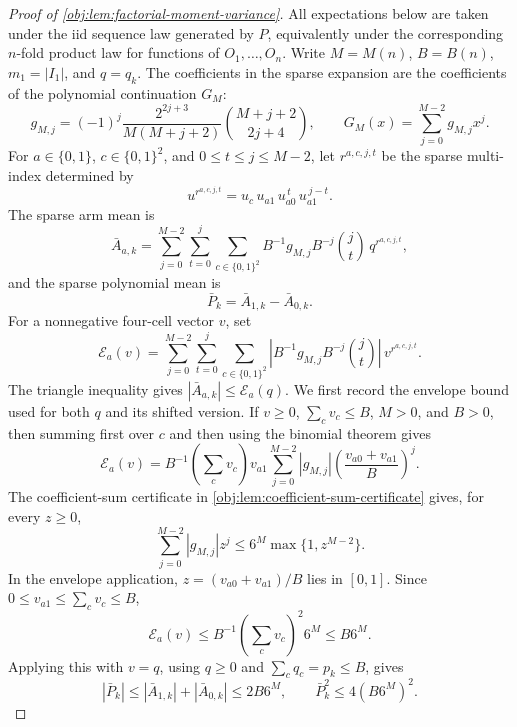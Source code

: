 \documentclass[11pt]{article}
\begin{document}
\begin{proof}[Proof of \cref{obj:lem:factorial-moment-variance}]
All expectations below are taken under the iid sequence law generated by \(P\), equivalently under the corresponding \(n\)-fold product law for functions of \(O_1,\ldots,O_n\). Write \(M=M(n)\), \(B=B(n)\), \(m_1=|I_1|\), and \(q=q_k\). The coefficients in the sparse expansion are the coefficients of the polynomial continuation \(G_M\):
\[
g_{M,j}=(-1)^j\frac{2^{2j+3}}{M(M+j+2)}\binom{M+j+2}{2j+4},
\qquad
G_M(x)=\sum_{j=0}^{M-2} g_{M,j}x^j .
\]
For \(a\in\{0,1\}\), \(c\in\{0,1\}^2\), and \(0\le t\le j\le M-2\), let \(r^{a,c,j,t}\) be the sparse multi-index determined by
\[
u^{r^{a,c,j,t}}=u_c\,u_{a1}\,u_{a0}^{\,t}\,u_{a1}^{\,j-t}.
\]
The sparse arm mean is
\[
\bar A_{a,k}
=
\sum_{j=0}^{M-2}\sum_{t=0}^{j}\sum_{c\in\{0,1\}^2}
B^{-1}g_{M,j}B^{-j}\binom jt\,q^{r^{a,c,j,t}},
\]
and the sparse polynomial mean is
\[
\bar P_k=\bar A_{1,k}-\bar A_{0,k}.
\]
For a nonnegative four-cell vector \(v\), set
\[
\mathcal E_a(v)
=
\sum_{j=0}^{M-2}\sum_{t=0}^{j}\sum_{c\in\{0,1\}^2}
\left|B^{-1}g_{M,j}B^{-j}\binom jt\right|\,v^{r^{a,c,j,t}}.
\]
The triangle inequality gives \(|\bar A_{a,k}|\le \mathcal E_a(q)\). We first record the envelope bound used for both \(q\) and its shifted version. If \(v\ge0\), \(\sum_c v_c\le B\), \(M>0\), and \(B>0\), then summing first over \(c\) and then using the binomial theorem gives
\[
\mathcal E_a(v)
= B^{-1}\left(\sum_c v_c\right)v_{a1}
\sum_{j=0}^{M-2}|g_{M,j}|
\left(\frac{v_{a0}+v_{a1}}{B}\right)^j .
\]
The coefficient-sum certificate in \cref{obj:lem:coefficient-sum-certificate} gives, for every \(z\ge0\),
\[
\sum_{j=0}^{M-2}|g_{M,j}|z^j
\le 6^M\max\{1,z^{M-2}\}.
\]
In the envelope application, \(z=(v_{a0}+v_{a1})/B\) lies in \([0,1]\). Since \(0\le v_{a1}\le \sum_c v_c\le B\),
\[
\mathcal E_a(v)
\le B^{-1}\left(\sum_c v_c\right)^2 6^M
\le B6^M .
\]
Applying this with \(v=q\), using \(q\ge0\) and \(\sum_c q_c=p_k\le B\), gives
\[
|\bar P_k|
\le |\bar A_{1,k}|+|\bar A_{0,k}|
\le 2B6^M,
\qquad
\bar P_k^2\le4(B6^M)^2.
\]


\end{proof}
\end{document}
